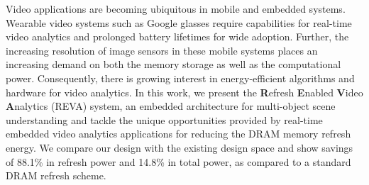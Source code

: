 Video applications are becoming ubiquitous in mobile and embedded systems. Wearable video systems such as Google glasses require capabilities for real-time video analytics and prolonged battery lifetimes for wide adoption. Further, the increasing resolution of image sensors in these mobile systems places an increasing demand on both the memory storage as well as the computational power. Consequently, there is growing interest in energy-efficient algorithms and hardware for video analytics. In this work, we present the \textbf{R}efresh \textbf{E}nabled \textbf{V}ideo \textbf{A}nalytics (REVA) system, an embedded architecture for multi-object scene understanding and tackle the unique opportunities provided by real-time embedded video analytics applications for reducing the DRAM memory refresh energy. We compare our design with the existing design space and show savings of 88.1\% in refresh power and 14.8\% in total power, as compared to a standard DRAM refresh scheme. 
